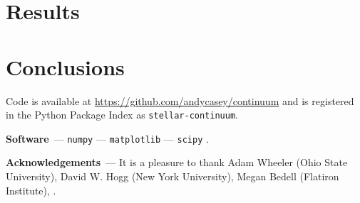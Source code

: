 \documentclass[modern]{aastex631}
\renewcommand{\paragraph}[1]{\medskip\par\noindent\textbf{#1}~---}
\begin{document}




\section{Results}\label{sec:results}

\section{Conclusions}\label{sec:conclusions}



Code is available at \url{https://github.com/andycasey/continuum} and is registered in the Python Package Index as \texttt{stellar-continuum}.

\paragraph{Software}
\texttt{numpy} \citep{numpy} ---
\texttt{matplotlib} \citep{matplotlib} ---
\texttt{scipy} \citep{scipy}.

\paragraph{Acknowledgements}
It is a pleasure to thank
    Adam Wheeler (Ohio State University),
    David W. Hogg (New York University),
    Megan Bedell (Flatiron Institute),
.

%
\end{document}
